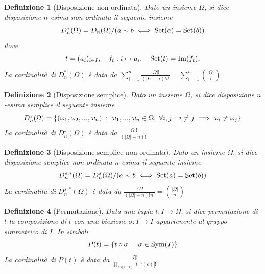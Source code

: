 \documentclass{article}
\newtheorem{definition}{Definizione}
\begin{document}
        \begin{definition}[Disposizione non ordinata]
            Dato un insieme $\Omega$, si dice disposizione $n$-esima non ordinata il seguente insieme
            \[
                D^{*}_{n}(\Omega) = D_{n}(\Omega) / (a \sim b \iff \textnormal{Set}(a) = \textnormal{Set}(b))
            \]
            dove
            \[
                t = (a_{i})_{i \in I}, \quad f_{t}: i \mapsto a_{i}, \quad \textnormal{Set}(t) = \textnormal{Im}(f_{t}),
            \]
            La cardinalità di $D^{*}_{n}(\Omega)$ è data da $\displaystyle \sum_{i = 1}^{n} \frac{|\Omega|!}{(|\Omega| - i)! i!} = \sum_{i = 1}^{n} \binom{|\Omega|}{i}$
        \end{definition}

        \begin{definition}[Disposizione semplice]
            Dato un insieme $\Omega$, si dice disposizione $n$-esima semplice il seguente insieme
            \[
                D^{s}_{n}(\Omega) = \qty{ (\omega_{1}, \omega_{2}, ..., \omega_{n}) \; : \; \omega_{1}, ..., \omega_{n} \in \Omega, \; \forall i, j \quad i \neq j \implies \omega_{i} \neq \omega_{j}}  
            \]
            La cardinalità di $D^{s}_{n}(\Omega)$ è data da $\displaystyle \frac{|\Omega|!}{(|\Omega| - n)!}$
        \end{definition}

        \begin{definition}[Disposizione semplice non ordinata]
            Dato un insieme $\Omega$, si dice disposizione semplice non ordinata $n$-esima il seguente insieme
            \[
                D^{s, *}_{n}(\Omega) = D^{s}_{n}(\Omega) / (a \sim b \iff \textnormal{Set}(a) = \textnormal{Set}(b))
            \]
            La cardinalità di $D^{s, *}_{n}(\Omega)$ è data da $\displaystyle \frac{|\Omega|!}{(|\Omega| - n)!n!} = \binom{|\Omega|}{n}$
        \end{definition}

        \begin{definition}[Permutazione]
            Data una tupla $t: I \rightarrow \Omega$, si dice permutazione di $t$ la composizione di $t$ con una biezione $\sigma: I \rightarrow I$ appartenente al gruppo simmetrico di $I$.
            In simboli
            \[
                P(t) = \{ t \circ \sigma \; : \; \sigma \in \textnormal{Sym}(I)\}
            \]
            La cardinalità di $P(t)$ è data da $\displaystyle \frac{|I|!}{\prod_{e \in t(I)} |t^{-1}(e)|!}$
        \end{definition}
\end{document}
